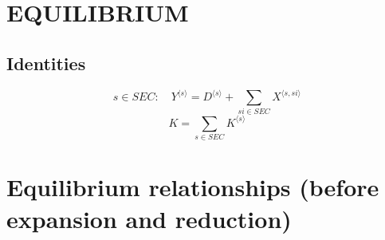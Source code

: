 \section{EQUILIBRIUM}

\subsection{Identities}

\begin{equation}
s\in {S\!E\!C}\colon\quad {Y}^{\langle s\rangle} = {D}^{\langle s\rangle} + \sum_{{s\!i}\in {S\!E\!C}} {X}^{\langle s,{s\!i}\rangle}
\end{equation}
\begin{equation}
K = \sum_{s\in {S\!E\!C}} {K}^{\langle s\rangle}
\end{equation}




\section{Equilibrium relationships (before expansion and reduction)}

